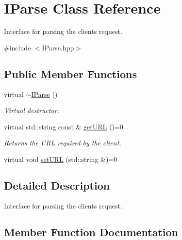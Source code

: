 \hypertarget{class_i_parse}{}\section{I\+Parse Class Reference}
\label{class_i_parse}


Interface for parsing the client\textquotesingle{}s request.  




{\ttfamily \#include $<$I\+Parse.\+hpp$>$}

\subsection*{Public Member Functions}
\begin{DoxyCompactItemize}
\item 
\hypertarget{class_i_parse_a72f8e36290a53f75e6922e43ea7baacc}{}virtual \hyperlink{class_i_parse_a72f8e36290a53f75e6922e43ea7baacc}{$\sim$\+I\+Parse} ()\label{class_i_parse_a72f8e36290a53f75e6922e43ea7baacc}

\begin{DoxyCompactList}\small\item\em Virtual destructor. \end{DoxyCompactList}\item 
\hypertarget{class_i_parse_ab622eab138c2535f21c5b04f80f6c327}{}virtual std\+::string const \& \hyperlink{class_i_parse_ab622eab138c2535f21c5b04f80f6c327}{get\+U\+R\+L} ()=0\label{class_i_parse_ab622eab138c2535f21c5b04f80f6c327}

\begin{DoxyCompactList}\small\item\em Returns the U\+R\+L required by the client. \end{DoxyCompactList}\item 
virtual void \hyperlink{class_i_parse_aac1e9d916cbb5097599ad3743d80d96c}{set\+U\+R\+L} (std\+::string \&)=0
\end{DoxyCompactItemize}


\subsection{Detailed Description}
Interface for parsing the client\textquotesingle{}s request. 

\subsection{Member Function Documentation}
\hypertarget{class_i_parse_aac1e9d916cbb5097599ad3743d80d96c}{}

